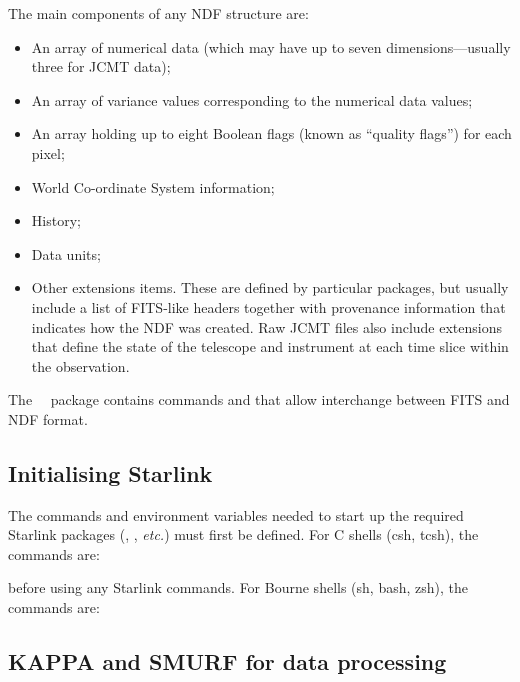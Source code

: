 The main components of any NDF structure are:
\begin{itemize}
\item An array of numerical data (which may have up to seven
dimensions---usually three for JCMT data);
\item An array of variance values corresponding to the numerical data
values;
\item An array holding up to eight Boolean flags (known as ``quality
flags'') for each pixel;
\item World Co-ordinate System information;
\item History;
\item Data units;
\item Other extensions items. These are defined by particular packages,
but usually include a list of FITS-like headers together with provenance
information that indicates how the NDF was created. Raw JCMT files also
include extensions that define the state of the telescope and instrument
at each time slice within the observation.
\end{itemize}

The \starlink\ \convert\ package contains commands  and
 that allow interchange between FITS
and NDF format.

\subsection{Initialising Starlink}
\label{sec:starinit}

The commands and environment variables needed to start up the required
Starlink packages (\smurf \cite{smurf}, \Kappa, \emph{etc.}) must first
be defined. For C shells (csh, tcsh), the commands are:

\begin{terminalv}
\end{terminalv}

before using any Starlink commands. For Bourne shells (sh, bash, zsh), the commands are:

\begin{terminalv}
\end{terminalv}

\subsection{KAPPA and SMURF for data processing}
\label{sec:packinit}

